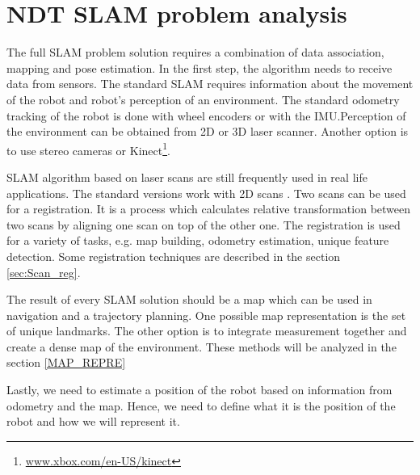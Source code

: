 \chapter{NDT SLAM problem analysis}

The full \gls{SLAM} problem solution requires a combination of data association, mapping and pose estimation.
In the first step, the algorithm needs to receive data from sensors. The standard SLAM requires information about the movement of the robot and robot's perception of an environment.  The standard odometry tracking of the robot is done with wheel encoders or with the \gls{IMU}.Perception of the environment can be obtained from 2D or 3D laser scanner. Another option is to use stereo cameras or Kinect\footnote{\url{www.xbox.com/en-US/kinect}}.  

\gls{SLAM} algorithm based on laser scans are still frequently used in real life applications. The standard versions work with 2D scans \cite{Hector} \cite{gmapping}. Two scans can be used for a registration. It is a process which calculates relative transformation between two scans by aligning one scan on top of the other one. The registration is used for a variety of tasks, e.g. map building, odometry estimation, unique feature detection. Some registration techniques are described in the section \ref{sec:Scan_reg}.

The result of every \gls{SLAM} solution should be a map which can be used in navigation and a trajectory planning. One possible map representation is the set of unique landmarks. The other option is to integrate measurement together and create a dense map of the environment. These methods will be analyzed in the section \ref{MAP_REPRE}

Lastly, we need to estimate a position of the robot based on information from odometry and the map. Hence, we need to define what it is the position of the robot and how we will represent it.
